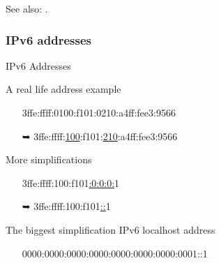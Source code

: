 See also: .

\subsubsection{IPv6 addresses}

\begin{frame}{IPv6 Addresses}
 \begin{block}{A real life address example}{\ttfamily
    \begin{itemize}
    \item[] 3ffe:ffff:0100:f101:0210:a4ff:fee3:9566
    \item[{\dejavu ➥}]
      3ffe:ffff:\underline{100}:f101:\underline{210}:a4ff:fee3:9566
    \end{itemize}}
 \end{block}
 \begin{block}{More simplifications}{\ttfamily
    \begin{itemize}
    \item[] 3ffe:ffff:100:f101\underline{:0:0:0:}1
    \item[{\dejavu ➥}] 3ffe:ffff:100:f101\underline{::}1
    \end{itemize}}
 \end{block}
 \begin{block}{The biggest simplification}
   IPv6 localhost address{\ttfamily
     \begin{itemize}
     \item[] 0000:0000:0000:0000:0000:0000:0000:0001\quad ::1
     \end{itemize}}
 \end{block}
\end{frame}


